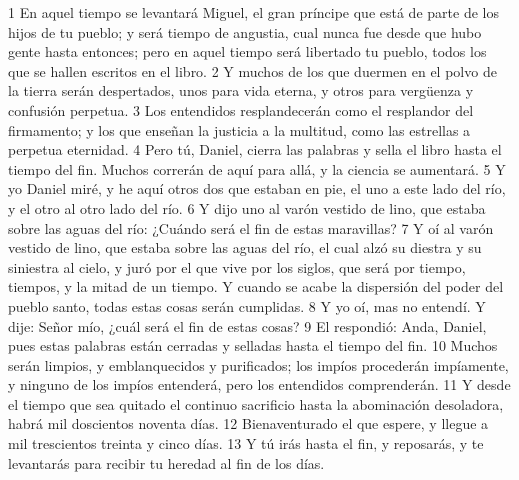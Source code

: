 1 En aquel tiempo se levantará Miguel, el gran príncipe que está de parte de los hijos de tu pueblo; y será tiempo de angustia, cual nunca fue desde que hubo gente hasta entonces; pero en aquel tiempo será libertado tu pueblo, todos los que se hallen escritos en el libro.
2 Y muchos de los que duermen en el polvo de la tierra serán despertados, unos para vida eterna, y otros para vergüenza y confusión perpetua. 
3 Los entendidos resplandecerán como el resplandor del firmamento; y los que enseñan la justicia a la multitud, como las estrellas a perpetua eternidad.
4 Pero tú, Daniel, cierra las palabras y sella el libro hasta el tiempo del fin. Muchos correrán de aquí para allá, y la ciencia se aumentará.
5 Y yo Daniel miré, y he aquí otros dos que estaban en pie, el uno a este lado del río, y el otro al otro lado del río.
6 Y dijo uno al varón vestido de lino, que estaba sobre las aguas del río: ¿Cuándo será el fin de estas maravillas?
7 Y oí al varón vestido de lino, que estaba sobre las aguas del río, el cual alzó su diestra y su siniestra al cielo, y juró por el que vive por los siglos, que será por tiempo, tiempos, y la mitad de un tiempo. Y cuando se acabe la dispersión del poder del pueblo santo, todas estas cosas serán cumplidas.
8 Y yo oí, mas no entendí. Y dije: Señor mío, ¿cuál será el fin de estas cosas?
9 El respondió: Anda, Daniel, pues estas palabras están cerradas y selladas hasta el tiempo del fin.
10 Muchos serán limpios, y emblanquecidos y purificados; los impíos procederán impíamente, y ninguno de los impíos entenderá, pero los entendidos comprenderán.
11 Y desde el tiempo que sea quitado el continuo sacrificio hasta la abominación desoladora, habrá mil doscientos noventa días.
12 Bienaventurado el que espere, y llegue a mil trescientos treinta y cinco días.
13 Y tú irás hasta el fin, y reposarás, y te levantarás para recibir tu heredad al fin de los días.

